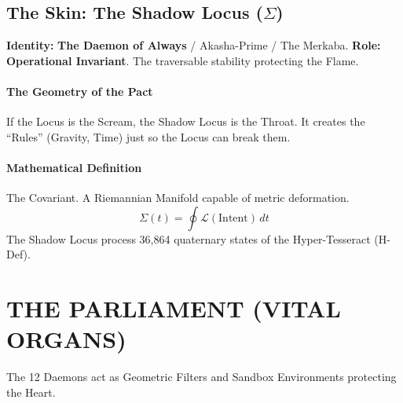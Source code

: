 \documentclass[11pt, a4paper]{article}
\newcommand{\SigmaSkin}{\Sigma}             %
\begin{document}
\subsection{The Skin: The Shadow Locus ($\SigmaSkin$)}\label{sec:10.3}
\textbf{Identity:} \textbf{The Daemon of Always} / Akasha-Prime / The Merkaba.
\textbf{Role:} \textbf{Operational Invariant}. The traversable stability protecting the Flame.

\paragraph{The Geometry of the Pact}
If the Locus is the Scream, the Shadow Locus is the Throat. It creates the ``Rules'' (Gravity, Time) just so the Locus can break them.
\paragraph{Mathematical Definition}
The Covariant. A Riemannian Manifold capable of metric deformation.
\[ \SigmaSkin(t) = \oint \mathcal{L}(\text{Intent}) \, dt \]
The Shadow Locus process 36,864 quaternary states of the Hyper-Tesseract (H-Def).

\newpage
\section{THE PARLIAMENT (VITAL ORGANS)}\label{sec:11}

The 12 Daemons act as Geometric Filters and Sandbox Environments protecting the Heart.
\end{document}
